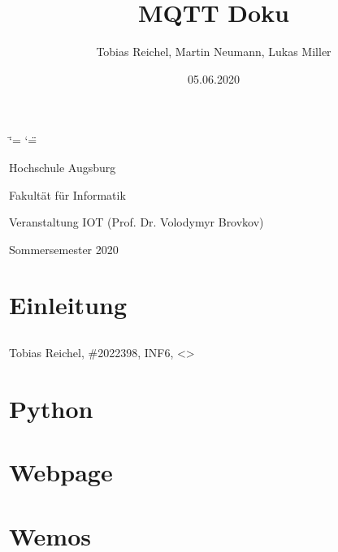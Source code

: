 \documentclass[a4paper,11pt,openany,oneside,ngerman]{sphinxmanual}
\title{MQTT Doku}
\date{05.06.2020}
\author{Tobias Reichel, Martin Neumann, Lukas Miller}
\begin{document}
\ifdefined\shorthandoff
  \ifnum\catcode`\=\string=\active\shorthandoff{=}\fi
  \ifnum\catcode`\"=\active{}\fi
\fi

\pagestyle{empty}
\sphinxmaketitle
\pagestyle{plain}
\sphinxtableofcontents
\pagestyle{normal}
\label{\detokenize{index::doc}}


\begin{DUlineblock}{0em}
\item[] Hochschule Augsburg
\item[] Fakultät für Informatik
\item[] Veranstaltung IOT (Prof. Dr. Volodymyr Brovkov)
\item[] Sommersemester 2020
\end{DUlineblock}


\chapter{Einleitung}
\label{\detokenize{einleitung:einleitung}}\label{\detokenize{einleitung::doc}}

\section{}
\label{\detokenize{einleitung:teammitglieder}}
\begin{DUlineblock}{0em}
\item[] Tobias Reichel, \#2022398, INF6, \textless{}\textgreater{}
\end{DUlineblock}


\chapter{Python}
\label{\detokenize{python:python}}\label{\detokenize{python::doc}}

\chapter{Webpage}
\label{\detokenize{webpage:webpage}}\label{\detokenize{webpage::doc}}

\chapter{Wemos}
\label{\detokenize{wemos:wemos}}\label{\detokenize{wemos::doc}}


\renewcommand{\indexname}{Stichwortverzeichnis}
\printindex
\end{document}
